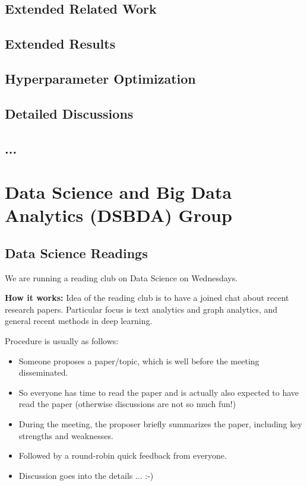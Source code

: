 \documentclass[sigconf, nonacm]{acmart}
\begin{document}

\subsection{Extended Related Work}
\label{appendix:extendedrelatedwork}

\subsection{Extended Results}
\label{appendix:extendedresults}

\subsection{Hyperparameter Optimization}
\label{appendix:hyperparameteroptimization}

\subsection{Detailed Discussions}
\label{appendix:detaileddiscussion}

\subsection{...}

\onecolumn





\section{Data Science and Big Data Analytics (DSBDA) Group}


\subsection{Data Science Readings}

We are running a reading club on Data Science on Wednesdays. 

\textbf{How it works:}
Idea of the reading club is to have a joined chat about recent research papers. Particular focus is text analytics and graph analytics, and general recent methods in deep learning. 

Procedure is usually as follows:
\begin{itemize}
\item Someone proposes a paper/topic, which is well before the meeting disseminated.
\item So everyone has time to read the paper and is actually also expected to have read the paper (otherwise discussions are not so much fun!)
\item During the meeting, the proposer briefly summarizes the paper, including key strengths and weaknesses.
\item Followed by a round-robin quick feedback from everyone.
\item Discussion goes into the details ... :-)
\end{itemize}
\end{document}
